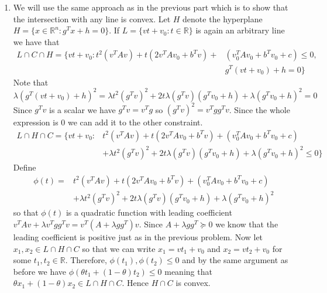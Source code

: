 \documentclass[11pt]{amsart}
\begin{document}
\begin{enumerate}
\begin{enumerate}
\item  We will use the same approach as in the previous part which is to show that the intersection with any line is convex.  Let $H$ denote the hyperplane $H = \{x \in \mathbb{R}^n: g^Tx + h = 0\}$.  If $L =  \{vt + v_0: t\in \mathbb{R}\}$ is again an arbitrary line we have that
\begin{align*}
L\cap C \cap H =\{ vt + v_0 :   t^2 (v^TAv) + t(2v^TAv_0 + b^Tv) + &(v_0^TAv_0 + b^Tv_0 + c)\le 0,\\
&g^T(vt  +v_0) + h = 0 \}
\end{align*}
Note that
\[
\lambda (g^T(vt  +v_0) + h)^2 = \lambda t^2 (g^Tv)^2 + 2t\lambda (g^Tv)(g^Tv_0 + h) + \lambda (g^T v_0 + h)^2 = 0
\]
Since $g^Tv$ is a scalar we have $g^Tv = v^Tg$ so $(g^Tv)^2 = v^Tgg^Tv$.  Since the whole expression is 0 we can add it to the other constraint.
\begin{align*}
L\cap H\cap C = \{ vt + v_0 :   &t^2 (v^TAv) + t(2v^TAv_0 + b^Tv) + (v_0^TAv_0 + b^Tv_0 + c)\\
&+  \lambda t^2 (g^Tv)^2 + 2t\lambda (g^Tv)(g^Tv_0 + h) + \lambda (g^T v_0 + h)^2 \le 0\}
\end{align*}
Define
\begin{align*}
\phi(t) = &t^2 (v^TAv) + t(2v^TAv_0 + b^Tv) + (v_0^TAv_0 + b^Tv_0 + c)\\
&+  \lambda t^2 (g^Tv)^2 + 2t\lambda (g^Tv)(g^Tv_0 + h) + \lambda (g^T v_0 + h)^2
\end{align*}
so that $\phi(t)$ is a quadratic function with leading coefficient $v^TAv + \lambda v^Tgg^Tv = v^T(A + \lambda gg^T)v$.  Since $A+\lambda gg^T \succeq 0$ we know that the leading coefficient is positive just as in the previous problem.  Now let $x_1,x_2\in L\cap H\cap C$ so that we can write $x_1 = vt_1 + v_0$ and $x_2 = vt_2 + v_0$ for some $t_1,t_2 \in \mathbb{R}$.  Therefore, $\phi(t_1),\phi(t_2) \le 0$ and by the same argument as before we have $\phi(\theta t_1 + (1-\theta)t_2) \le 0$ meaning that $\theta x_1 + (1-\theta)x_2 \in L\cap H\cap C$.  Hence $H\cap C$ is convex.
\end{enumerate}




\end{enumerate}
\end{document}
